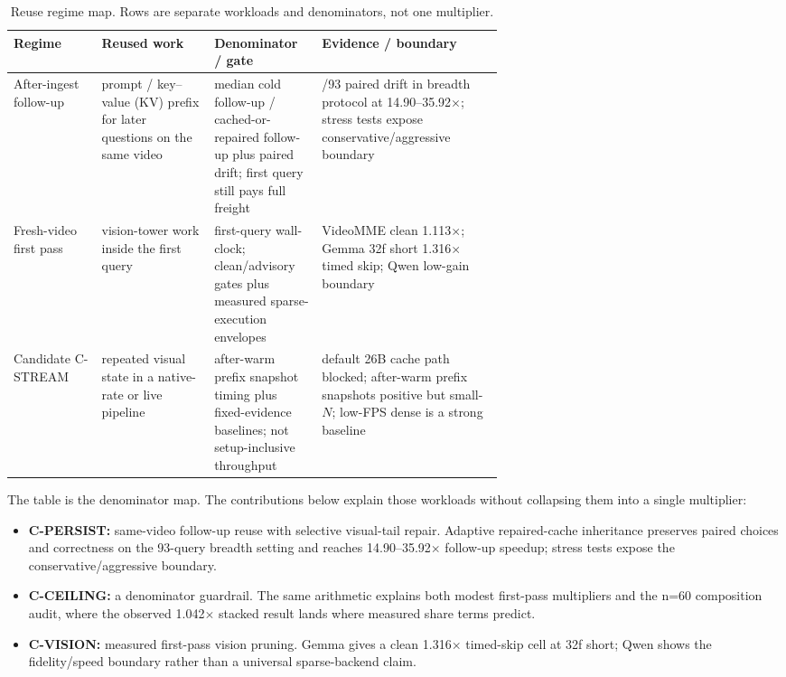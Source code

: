 \begin{table}[H]
\centering
\caption{Reuse regime map. Rows are separate workloads and denominators, not
one multiplier.}
\label{tab:three-regimes}
\footnotesize
\renewcommand{\arraystretch}{\PaperTableStretch}
\begin{tabularx}{\linewidth}{@{}
  >{\raggedright\arraybackslash}p{0.18\linewidth}
  >{\raggedright\arraybackslash}p{0.23\linewidth}
  >{\raggedright\arraybackslash}p{0.22\linewidth}
  >{\raggedright\arraybackslash}X
@{}}
\toprule
Regime & Reused work & Denominator / gate & Evidence / boundary \\
\midrule
After-ingest follow-up & prompt / key--value (KV) prefix for later questions on the same video & median cold follow-up / cached-or-repaired follow-up plus paired drift; first query still pays full freight & 0/93 paired drift in breadth protocol at 14.90--35.92$\times$; stress tests expose conservative/aggressive boundary \\
Fresh-video first pass & vision-tower work inside the first query & first-query wall-clock; clean/advisory gates plus measured sparse-execution envelopes & VideoMME clean 1.113$\times$; Gemma 32f short 1.316$\times$ timed skip; Qwen low-gain boundary \\
Candidate C-STREAM & repeated visual state in a native-rate or live pipeline & after-warm prefix snapshot timing plus fixed-evidence baselines; not setup-inclusive throughput & default 26B cache path blocked; after-warm prefix snapshots positive but small-\(N\); low-FPS dense is a strong baseline \\
\bottomrule
\end{tabularx}
\end{table}

The table is the denominator map. The contributions below explain those
workloads without collapsing them into a single multiplier:
\begin{itemize}[leftmargin=1.5em]
\item \textbf{C-PERSIST:} same-video follow-up reuse with selective visual-tail
repair. Adaptive repaired-cache inheritance preserves paired choices and
correctness on the 93-query breadth setting and reaches 14.90--35.92$\times$
follow-up speedup; stress tests expose the conservative/aggressive boundary.
\item \textbf{C-CEILING:} a denominator guardrail. The same arithmetic explains
both modest first-pass multipliers and the n=60 composition audit, where the
observed 1.042$\times$ stacked result lands where measured share terms predict.
\item \textbf{C-VISION:} measured first-pass vision pruning. Gemma gives a
clean 1.316$\times$ timed-skip cell at 32f short; Qwen shows the
fidelity/speed boundary rather than a universal sparse-backend claim.
\end{itemize}

